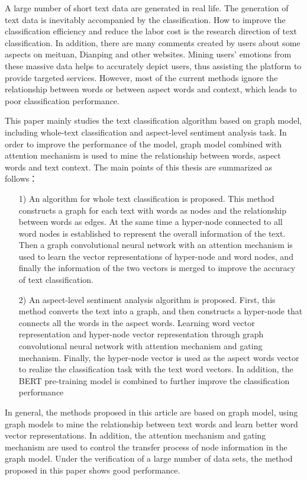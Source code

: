 
\begin{englishabstract}
	A large number of short text data are generated in real life. The generation of text data is inevitably accompanied by the classification. 
	How to improve the classification efficiency and reduce the labor cost is the research direction of text classification.
	In addition, there are many comments created by users about some aspects on meituan, Dianping and other websites. 
	Mining users' emotions from these massive data helps to accurately depict users, thus assisting the platform to provide targeted services. 
	However, most of the current methods ignore the relationship between words or between aspect words and context, which leads to poor classification performance. 

	This paper mainly studies the text classification algorithm based on graph model, including whole-text classification and aspect-level sentiment analysis task. 
	In order to improve the performance of the model, graph model combined with attention mechanism is used to mine the relationship between words, aspect words and text context. The main points of this thesis are summarized as follows：

	\begin{itemize}
		\item [1)] 
		An algorithm for whole text classification is proposed. This method constructs a graph for each text with words as nodes and the relationship between words as edges. 
		At the same time a hyper-node connected to all word nodes is established to represent the overall information of the text. 
		Then a graph convolutional neural network with an attention mechanism is used to learn the vector representations of hyper-node and word nodes, and finally the information of the two vectors is merged to improve the accuracy of text classification.
		\item [2)] 
		An aspect-level sentiment analysis algorithm is proposed. First, this method converts the text into a graph, and then constructs a hyper-node that connects all the words in the aspect words. 
		Learning word vector representation and hyper-node vector representation through graph convolutional neural network with attention mechanism and gating mechanism. 
		Finally, the hyper-node vector is used as the aspect words vector to realize the classification task with the text word vectors. 
		In addition, the BERT pre-training model is combined to further improve the classification performance
	\end{itemize}

	In general, the methods proposed in this article are based on graph model, using graph models to mine the relationship between text words and learn better word vector representations. 
	In addition, the attention mechanism and gating mechanism are used to control the transfer process of node information in the graph model. 
	Under the verification of a large number of data sets, the method proposed in this paper shows good performance.

\end{englishabstract}


